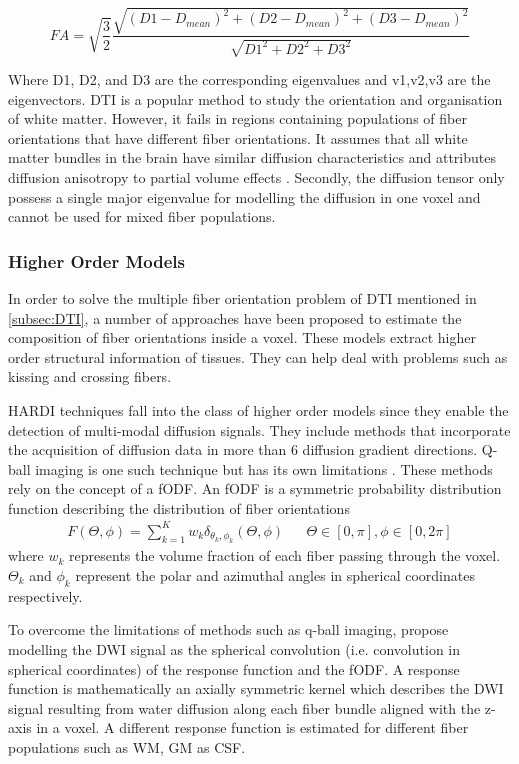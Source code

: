 \documentclass[msthesis.tex]{subfiles}
\begin{document}
\begin{equation}
\label{eq:meanFA}
FA = \sqrt{\frac{3}{2}} \frac{\sqrt{(D1 -D_{mean})^2+(D2 -D_{mean})^2 + (D3 -D_{mean})^2
}}{\sqrt{D1^2 + D2^2 + D3^2}}
\end{equation}

Where D1, D2, and D3 are the corresponding eigenvalues and v1,v2,v3 are the eigenvectors.
\gls{DTI} is a popular method to study the orientation and organisation of white matter. However, it fails in regions containing populations of fiber orientations that have different fiber orientations. It assumes that all white matter bundles in the brain have similar diffusion characteristics and attributes diffusion anisotropy to partial volume effects \citep{tournier2004direct}. Secondly, the diffusion tensor only possess a single major eigenvalue for modelling the diffusion in one voxel and cannot be used for mixed fiber populations.
\subsubsection{Higher Order Models}
\label{sec:highermodels}

In order to solve the multiple fiber orientation problem of \gls{DTI} mentioned in \autoref{subsec:DTI}, a number of approaches have been proposed to estimate the composition of fiber orientations inside a voxel. These models extract higher order structural information of tissues. They can help deal with problems such as kissing and crossing fibers. 

\gls{HARDI} techniques fall into the class of higher order models since they enable the detection of multi-modal diffusion signals. They include methods that incorporate the acquisition of diffusion data in more than 6 diffusion gradient directions. Q-ball imaging is one such technique but has its own limitations \citep{TOURNIER20041176}. These methods rely on the concept of a \gls{fODF}. An \gls{fODF} is a symmetric probability distribution function describing the distribution of fiber orientations
\begin{align}
  F(\Theta, \phi) = \sum_{k=1}^{K} w_k \delta_{\theta_k, \phi_k}(\Theta, \phi) &
 & \Theta \in [0, \pi], \phi \in [0,2\pi]
\end{align}
where $w_k$ represents the volume fraction of each fiber passing through the voxel. $\Theta_k$ and $\phi_k$ represent the polar and azimuthal angles in spherical coordinates respectively.

To overcome the limitations of methods such as q-ball imaging, \cite{tournier2004direct} propose modelling the \gls{DWI} signal as the spherical convolution (i.e. convolution in spherical coordinates) of the response function and the \gls{fODF}. A response function is mathematically an axially symmetric kernel which describes the \gls{DWI} signal resulting from water diffusion along each fiber bundle aligned with the z-axis in a voxel. A different response function is estimated for different fiber populations such as \gls{WM}, \gls{GM} as \gls{CSF}.
\end{document}
